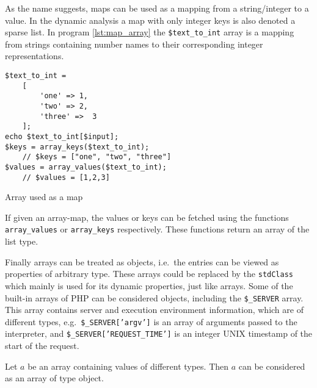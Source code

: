As the name suggests, maps can be used as a mapping from a string/integer to a value. In the dynamic analysis a map with only integer keys is also denoted a sparse list. In program \ref{lst:map_array} the \texttt{\$text\_to\_int} array is a mapping from strings containing number names to their corresponding integer representations. 

\begin{program}[ht]
\begin{lstlisting}
$text_to_int = 
    [ 
        'one' => 1,
        'two' => 2,
        'three' =>  3
    ];
echo $text_to_int[$input]; 
$keys = array_keys($text_to_int);
    // $keys = ["one", "two", "three"]
$values = array_values($text_to_int);
    // $values = [1,2,3]
\end{lstlisting}
\caption{Array used as a map}
\label{lst:map_array}
\end{program}

If given an array-map, the values or keys can be fetched using the functions \texttt{array\_values} or \texttt{array\_keys} respectively. These functions return an array of the list type. 

Finally arrays can be treated as objects, i.e.\ the entries can be viewed as properties of arbitrary type. These arrays could be replaced by the \texttt{stdClass} which mainly is used for its dynamic properties, just like arrays. Some of the built-in arrays of PHP can be considered objects, including the \texttt{\$\_SERVER} array. This array contains server and execution environment information, which are of different types, e.g.\ \texttt{\$\_SERVER['argv']} is an array of arguments passed to the interpreter, and \texttt{\$\_SERVER['REQUEST\_TIME']} is an integer UNIX timestamp of the start of the request. 

\begin{definition}
\label{def:object}
Let $a$ be an array containing values of different types. Then $a$ can be considered as an array of type object.
\end{definition}


